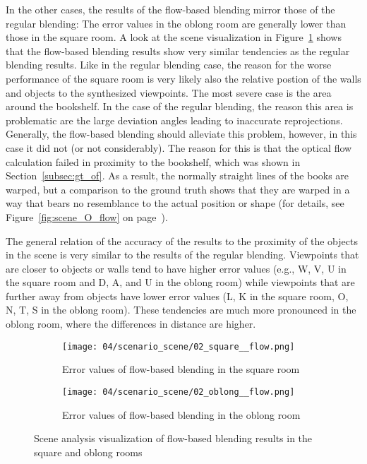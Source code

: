 In the other cases, the results of the flow-based blending mirror those of the regular blending: The error values in the oblong room are generally lower than those in the square room. A look at the scene visualization in Figure~\ref{fig:scene_flow_square_oblong} shows that the flow-based blending results show very similar tendencies as the regular blending results. 
Like in the regular blending case, the reason for the worse performance of the square room is very likely also the relative postion of the walls and objects to the synthesized viewpoints.
The most severe case is the area around the bookshelf. In the case of the regular blending, the reason this area is problematic are the large deviation angles leading to inaccurate reprojections. Generally, the flow-based blending should alleviate this problem, however, in this case it did not (or not considerably).
The reason for this is that
the optical flow calculation failed in proximity to the bookshelf, which was shown in Section~\ref{subsec:gt_of}. As a result, the normally straight lines of the books are warped, but a comparison to the ground truth shows that they are warped in a way that bears no resemblance to the actual position or shape (for details, see Figure~\ref{fig:scene_O_flow} on page~\pageref{fig:scene_O_flow}). 

The general relation of the accuracy of the results to the proximity of the objects in the scene is very similar to the results of the regular blending. Viewpoints that are closer to objects or walls tend to have higher error values (e.g., W, V, U in the square room and D, A, and U in the oblong room) while viewpoints that are further away from objects have lower error values (L, K in the square room, O, N, T, S in the oblong room). These tendencies are much more pronounced in the oblong room, where the differences in distance are higher.

\begin{figure}
\centering
    \hfill
    \begin{subfigure}[b]{0.4\textwidth}
            \centering
            \texttt{[image: 04/scenario\_scene/02\_square\_\_flow.png]}
            \caption{Error values of flow-based blending in the square room}
    \end{subfigure}
    \hfill
    \begin{subfigure}[b]{0.4\textwidth}
            \centering
            \texttt{[image: 04/scenario\_scene/02\_oblong\_\_flow.png]}
            \caption{Error values of flow-based blending in the oblong room}
    \end{subfigure}
    \hfill
  \caption{Scene analysis visualization of flow-based blending results in the square and oblong rooms} \label{fig:scene_flow_square_oblong}
\end{figure}




